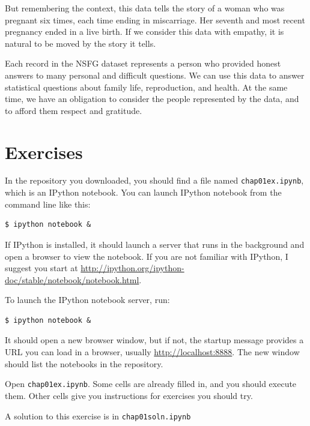 \documentclass[12pt]{book}
\begin{document}
But remembering the context, this data tells the story of a woman who
was pregnant six times, each time ending in miscarriage.  Her seventh
and most recent pregnancy ended in a live birth.  If we consider this
data with empathy, it is natural to be moved by the story it tells.

Each record in the NSFG dataset represents a person who provided
honest answers to many personal and difficult questions.  We can use
this data to answer statistical questions about family life,
reproduction, and health.  At the same time, we have an obligation
to consider the people represented by the data, and to afford them
respect and gratitude.


\section{Exercises}

\begin{exercise}
In the repository you downloaded, you should find a file named
\verb"chap01ex.ipynb", which is an IPython notebook.  You can
launch IPython notebook from the command line like this:

\begin{verbatim}
$ ipython notebook &
\end{verbatim}

If IPython is installed, it should launch a server that runs in the
background and open a browser to view the notebook.  If you are not
familiar with IPython, I suggest you start at
\url{http://ipython.org/ipython-doc/stable/notebook/notebook.html}.

To launch the IPython notebook server, run:

\begin{verbatim}
$ ipython notebook &
\end{verbatim}

It should open a new browser window, but if not, the startup
message provides a URL you can load in a browser, usually
\url{http://localhost:8888}.  The new window should list the notebooks
in the repository.

Open \verb"chap01ex.ipynb".  Some cells are already filled in, and
you should execute them.  Other cells give you instructions for
exercises you should try.

A solution to this exercise is in \verb"chap01soln.ipynb"
\end{exercise}
\end{document}

